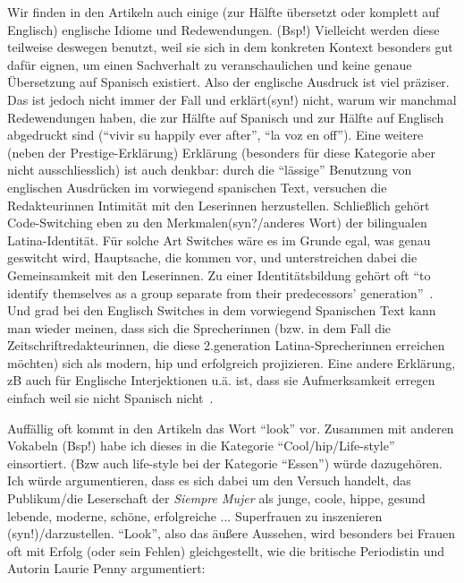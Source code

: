 Wir finden in den Artikeln auch einige (zur Hälfte übersetzt oder komplett auf Englisch) englische Idiome und Redewendungen.
(Bsp!)
Vielleicht werden diese teilweise deswegen benutzt, weil sie sich in dem konkreten Kontext besonders gut dafür eignen, um einen Sachverhalt zu veranschaulichen und keine genaue Übersetzung auf Spanisch existiert.
Also der englische Ausdruck ist viel präziser.
Das ist jedoch nicht immer der Fall und erklärt(syn!) nicht, warum wir manchmal Redewendungen haben, die zur Hälfte auf Spanisch und zur Hälfte auf Englisch abgedruckt sind (``vivir su happily ever after'', ``la voz en off'').
Eine weitere (neben der Prestige-Erklärung) Erklärung (besonders für diese Kategorie aber nicht ausschliesslich) ist auch denkbar:
durch die ``lässige'' Benutzung von englischen Ausdrücken im vorwiegend spanischen Text, versuchen die Redakteurinnen Intimität mit den Leserinnen herzustellen. %
Schließlich gehört Code-Switching eben zu den Merkmalen(syn?/anderes Wort) der bilingualen Latina-Identität.
Für solche Art Switches wäre es im Grunde egal, was genau geswitcht wird, Hauptsache, die kommen vor, und unterstreichen dabei die Gemeinsamkeit mit den Leserinnen.
Zu einer Identitätsbildung gehört oft ``to identify themselves as a group separate from their predecessors’ generation''~\cite[]{Mahootian05}.
Und grad bei den Englisch Switches in dem vorwiegend Spanischen Text kann man wieder meinen, dass sich die Sprecherinnen (bzw. in dem Fall die Zeitschriftredakteurinnen, die diese 2.generation Latina-Sprecherinnen erreichen möchten) sich als modern, hip und erfolgreich projizieren.
Eine andere Erklärung, zB auch für Englische Interjektionen u.ä. ist, dass sie Aufmerksamkeit erregen einfach weil sie nicht Spanisch nicht~\cite[]{Mahootian05}. %
\begin{comment}
→ style/socioindexicality: adopt linguistic forms of groups one sympathises with/has intense
  relationships with (Eckert08 ?)
→ "Although overt norms favor standard speech, powerful covert norms encourage
group members to remain faithful to group codes, linguistic and otherwise." (Zentella 2007)
\end{comment}

Auffällig oft kommt in den Artikeln das Wort ``look'' vor.
Zusammen mit anderen Vokabeln (Bsp!) habe ich dieses in die Kategorie ``Cool/hip/Life-style'' einsortiert.
(Bzw auch life-style bei der Kategorie ``Essen'') würde dazugehören.
Ich würde argumentieren, dass es sich dabei um den Versuch handelt, das Publikum/die Leserschaft der \textit{Siempre Mujer} als junge, coole, hippe, gesund lebende, moderne, schöne, erfolgreiche ... Superfrauen zu inszenieren (syn!)/darzustellen.
``Look'', also das äußere Aussehen, wird besonders bei Frauen oft mit Erfolg (oder sein Fehlen) gleichgestellt, wie die britische Periodistin und Autorin Laurie Penny argumentiert:

